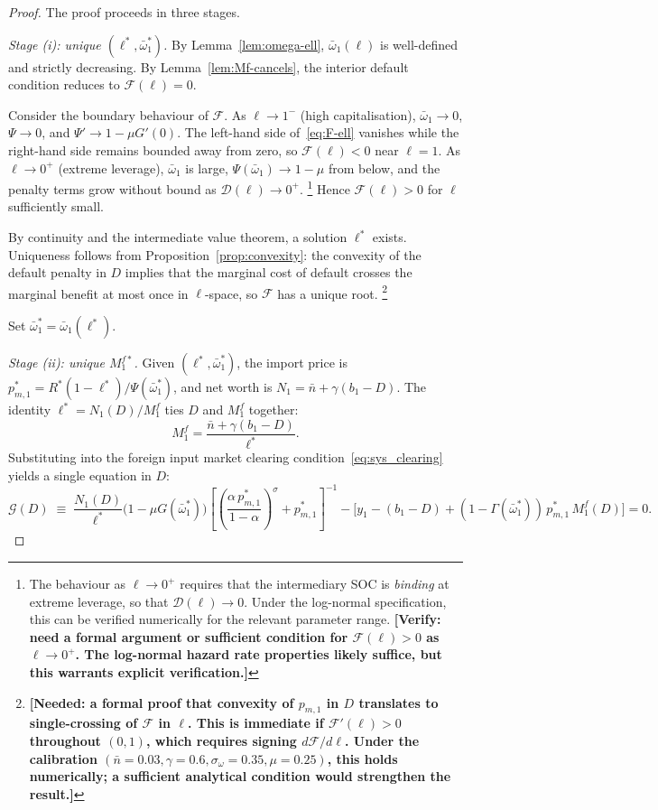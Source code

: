 \begin{proof}
The proof proceeds in three stages.

\emph{Stage (i): unique $(\ell^*, \bar\omega_1^*)$.}\quad
By Lemma~\ref{lem:omega-ell}, $\bar\omega_1(\ell)$ is well-defined and strictly decreasing.  By Lemma~\ref{lem:Mf-cancels}, the interior default condition reduces to $\mathcal{F}(\ell) = 0$.

Consider the boundary behaviour of $\mathcal{F}$.  As $\ell \to 1^{-}$ (high capitalisation), $\bar\omega_1 \to 0$, $\Psi \to 0$, and $\Psi' \to 1 - \mu G'(0)$.  The left-hand side of~\eqref{eq:F-ell} vanishes while the right-hand side remains bounded away from zero, so $\mathcal{F}(\ell) < 0$ near $\ell = 1$.  As $\ell \to 0^{+}$ (extreme leverage), $\bar\omega_1$ is large, $\Psi(\bar\omega_1) \to 1 - \mu$ from below, and the penalty terms grow without bound as $\mathcal{D}(\ell) \to 0^+$.%
\footnote{The behaviour as $\ell \to 0^+$ requires that the intermediary SOC is \emph{binding} at extreme leverage, so that $\mathcal{D}(\ell) \to 0$.  Under the log-normal specification, this can be verified numerically for the relevant parameter range.  \textbf{[Verify: need a formal argument or sufficient condition for $\mathcal{F}(\ell) > 0$ as $\ell \to 0^+$.  The log-normal hazard rate properties likely suffice, but this warrants explicit verification.]}}  Hence $\mathcal{F}(\ell) > 0$ for $\ell$ sufficiently small.

By continuity and the intermediate value theorem, a solution $\ell^*$ exists.  Uniqueness follows from Proposition~\ref{prop:convexity}: the convexity of the default penalty in $D$ implies that the marginal cost of default crosses the marginal benefit at most once in $\ell$-space, so $\mathcal{F}$ has a unique root.%
\footnote{\textbf{[Needed: a formal proof that convexity of $p_{m,1}$ in $D$ translates to single-crossing of $\mathcal{F}$ in $\ell$.  This is immediate if $\mathcal{F}'(\ell) > 0$ throughout $(0,1)$, which requires signing $d\mathcal{F}/d\ell$.  Under the calibration $(\bar n = 0.03, \gamma = 0.6, \sigma_\omega = 0.35, \mu = 0.25)$, this holds numerically; a sufficient analytical condition would strengthen the result.]}}

Set $\bar\omega_1^* = \bar\omega_1(\ell^*)$.

\emph{Stage (ii): unique $M_1^{f*}$.}\quad
Given $(\ell^*, \bar\omega_1^*)$, the import price is $p_{m,1}^* = R^* (1 - \ell^*) / \Psi(\bar\omega_1^*)$, and net worth is $N_1 = \bar n + \gamma(b_1 - D)$.  The identity $\ell^* = N_1(D) / M_1^f$ ties $D$ and $M_1^f$ together:
\[
    M_1^f = \frac{\bar n + \gamma(b_1 - D)}{\ell^*}.
\]
Substituting into the foreign input market clearing condition~\eqref{eq:sys_clearing} yields a single equation in $D$:
\begin{equation}\label{eq:G-D}
    \mathcal{G}(D) \;\equiv\; \frac{N_1(D)}{\ell^*}\bigl(1 - \mu G(\bar\omega_1^*)\bigr)\left[\left(\frac{\alpha\, p_{m,1}^*}{1 - \alpha}\right)^{\!\sigma} + p_{m,1}^*\right]^{-1} - \bigl[y_1 - (b_1 - D) + (1 - \Gamma(\bar\omega_1^*))\,p_{m,1}^*\,M_1^f(D)\bigr] = 0.
\end{equation}


\end{proof}
